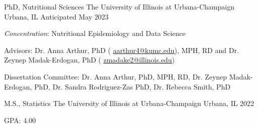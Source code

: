 






\begin{cventries}

  \cventry
    {PhD, Nutritional Sciences} %
    {The University of Illinois at Urbana-Champaign} %
    {Urbana, IL} %
    {Anticipated May 2023} %
    {
      \begin{cvitems} %
        \item {\textit{Concentration}: Nutritional Epidemiology and Data Science}
         \item {Advisors: Dr. Anna Arthur, PhD ( \textcolor{navyblue}{{\underline{\href{mailto:aarthur4@kumc.edu}{aarthur4@kumc.edu}}}}), MPH, RD and Dr. Zeynep Madak-Erdogan, PhD ( \textcolor{navyblue}{\underline{\href{mailto:zmadake2@illinois.edu}{zmadake2@illinois.edu}}})}
         \item{Dissertation Committee: Dr. Anna Arthur, PhD, MPH, RD, Dr. Zeynep Madak-Erdogan, PhD, Dr. Sandra Rodriguez-Zas PhD, Dr. Rebecca Smith, PhD}
      \end{cvitems}
    }


  \cventry
    {M.S., Statistics} %
    {The University of Illinois at Urbana-Champaign} %
    {Urbana, IL} %
    {2022} %
    {
      \begin{cvitems} %
        \item {GPA: 4.00}
      \end{cvitems}
    }



\end{cventries}
